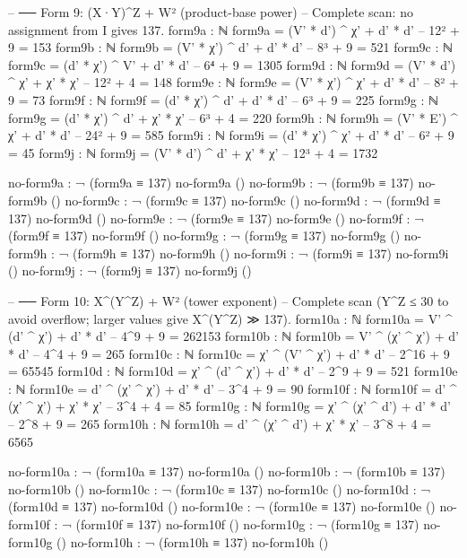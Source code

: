 \documentclass[11pt,a4paper]{article}
\begin{document}
\begin{code}
-- ── Form 9: (X·Y)^Z + W²  (product-base power)
-- Complete scan: no assignment from I gives 137.
form9a : ℕ
form9a = (V' * d') ^ χ' + d' * d'             -- 12² + 9 = 153
form9b : ℕ
form9b = (V' * χ') ^ d' + d' * d'             -- 8³ + 9 = 521
form9c : ℕ
form9c = (d' * χ') ^ V' + d' * d'             -- 6⁴ + 9 = 1305
form9d : ℕ
form9d = (V' * d') ^ χ' + χ' * χ'             -- 12² + 4 = 148
form9e : ℕ
form9e = (V' * χ') ^ χ' + d' * d'             -- 8² + 9 = 73
form9f : ℕ
form9f = (d' * χ') ^ d' + d' * d'             -- 6³ + 9 = 225
form9g : ℕ
form9g = (d' * χ') ^ d' + χ' * χ'             -- 6³ + 4 = 220
form9h : ℕ
form9h = (V' * E') ^ χ' + d' * d'             -- 24² + 9 = 585
form9i : ℕ
form9i = (d' * χ') ^ χ' + d' * d'             -- 6² + 9 = 45
form9j : ℕ
form9j = (V' * d') ^ d' + χ' * χ'             -- 12³ + 4 = 1732

no-form9a : ¬ (form9a ≡ 137)
no-form9a ()
no-form9b : ¬ (form9b ≡ 137)
no-form9b ()
no-form9c : ¬ (form9c ≡ 137)
no-form9c ()
no-form9d : ¬ (form9d ≡ 137)
no-form9d ()
no-form9e : ¬ (form9e ≡ 137)
no-form9e ()
no-form9f : ¬ (form9f ≡ 137)
no-form9f ()
no-form9g : ¬ (form9g ≡ 137)
no-form9g ()
no-form9h : ¬ (form9h ≡ 137)
no-form9h ()
no-form9i : ¬ (form9i ≡ 137)
no-form9i ()
no-form9j : ¬ (form9j ≡ 137)
no-form9j ()
\end{code}

\begin{code}
-- ── Form 10: X^(Y^Z) + W²  (tower exponent)
-- Complete scan (Y^Z ≤ 30 to avoid overflow; larger values give X^(Y^Z) ≫ 137).
form10a : ℕ
form10a = V' ^ (d' ^ χ') + d' * d'            -- 4^9 + 9 = 262153
form10b : ℕ
form10b = V' ^ (χ' ^ χ') + d' * d'            -- 4^4 + 9 = 265
form10c : ℕ
form10c = χ' ^ (V' ^ χ') + d' * d'            -- 2^16 + 9 = 65545
form10d : ℕ
form10d = χ' ^ (d' ^ χ') + d' * d'            -- 2^9 + 9 = 521
form10e : ℕ
form10e = d' ^ (χ' ^ χ') + d' * d'            -- 3^4 + 9 = 90
form10f : ℕ
form10f = d' ^ (χ' ^ χ') + χ' * χ'            -- 3^4 + 4 = 85
form10g : ℕ
form10g = χ' ^ (χ' ^ d') + d' * d'            -- 2^8 + 9 = 265
form10h : ℕ
form10h = d' ^ (χ' ^ d') + χ' * χ'            -- 3^8 + 4 = 6565

no-form10a : ¬ (form10a ≡ 137)
no-form10a ()
no-form10b : ¬ (form10b ≡ 137)
no-form10b ()
no-form10c : ¬ (form10c ≡ 137)
no-form10c ()
no-form10d : ¬ (form10d ≡ 137)
no-form10d ()
no-form10e : ¬ (form10e ≡ 137)
no-form10e ()
no-form10f : ¬ (form10f ≡ 137)
no-form10f ()
no-form10g : ¬ (form10g ≡ 137)
no-form10g ()
no-form10h : ¬ (form10h ≡ 137)
no-form10h ()
\end{code}
\end{document}
